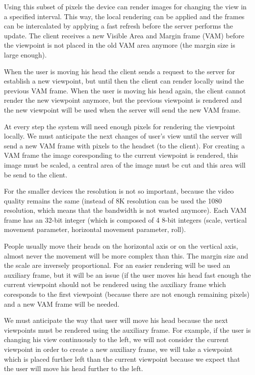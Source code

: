 \documentclass[conference]{IEEEtran}
\begin{document}
Using this subset of pixels the device can render images for changing the view in a specified interval. This way, the local rendering can be applied and the frames can be intercalated by applying a fast refresh before the server performs the update. The client receives a new Visible Area and Margin frame (VAM) before the viewpoint is not placed in the old VAM area anymore (the margin size is large enough). 

When the user is moving his head the client sends a request to the server for establish a new viewpoint, but until then the client can render locally usind the previous VAM frame. When the user is moving his head again, the client cannot render the new viewpoint anymore, but the previous viewpoint is rendered and the new viewpoint will be used when the server will send the new VAM frame.

At every step the system will need enough pixels for rendering the viewpoint locally. We must anticipate the next changes of user's view until the server will send a new VAM frame with pixels to the headset (to the client). For creating a VAM frame the image coresponding to the current viewpoint is rendered, this image must be scaled, a central area of the image must be cut and this area will be send to the client. 

For the smaller devices the resolution is not so important, because the video quality remains the same (instead of 8K resolution can be used the 1080 resolution, which means that the bandwidth is not wasted anymore). Each VAM frame has an 32-bit integer (which is composed of 4 8-bit integers (scale, vertical movement parameter, horizontal movement parameter, roll).

People usually move their heads on the horizontal axis or on the vertical axis, almost never the movement will be more complex than this. The margin size and the scale are inversely proportional. For an easier rendering will be used an auxiliary frame, but it will be an issue (if the user moves his head fast enough the current viewpoint should not be rendered using the auxiliary frame which coresponds to the first viewpoint (because there are not enough remaining pixels) and a new VAM frame will be needed.

We must anticipate the way that user will move his head because the next viewpoints must be rendered using the auxiliary frame. For example, if the user is changing his view continuously to the left, we will not consider the current viewpoint in order to create a new auxiliary frame, we will take a viewpoint which is placed further left than the current viewpoint because we expect that the user will move his head further to the left.
\end{document}
